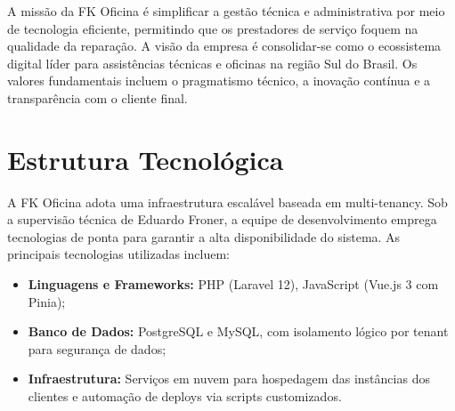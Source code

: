 A missão da FK Oficina é simplificar a gestão técnica e administrativa por meio de tecnologia eficiente, permitindo que os prestadores de serviço foquem na qualidade da reparação. A visão da empresa é consolidar-se como o ecossistema digital líder para assistências técnicas e oficinas na região Sul do Brasil. Os valores fundamentais incluem o pragmatismo técnico, a inovação contínua e a transparência com o cliente final.

\section{Estrutura Tecnológica}
\label{sec:estrutura-tecnologica}

A FK Oficina adota uma infraestrutura escalável baseada em multi-tenancy. Sob a supervisão técnica de Eduardo Froner, a equipe de desenvolvimento emprega tecnologias de ponta para garantir a alta disponibilidade do sistema. As principais tecnologias utilizadas incluem:

\begin{itemize}
    \item \textbf{Linguagens e Frameworks:} PHP (Laravel 12), JavaScript (Vue.js 3 com Pinia);
    \item \textbf{Banco de Dados:} PostgreSQL e MySQL, com isolamento lógico por tenant para segurança de dados;
    \item \textbf{Infraestrutura:} Serviços em nuvem para hospedagem das instâncias dos clientes e automação de deploys via scripts customizados.
\end{itemize}
